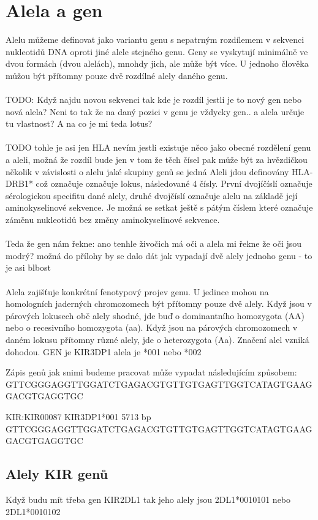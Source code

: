 \documentclass[czech,DP]{thesiskiv}
\begin{document}
\section{Alela a gen}
Alelu můžeme definovat jako variantu genu s nepatrným rozdílemem v sekvenci nukleotidů DNA oproti jiné alele stejného genu. Geny se vyskytují minimálně ve dvou formách (dvou alelách), mnohdy jich, ale může být více. U jednoho člověka můžou být přítomny pouze dvě rozdílné alely daného genu. 
\\
\\
TODO: Když najdu novou sekvenci tak kde je rozdíl jestli je to nový gen nebo nová alela? Neni to tak že na daný pozici v genu je vždycky gen.. a alela určuje tu vlastnost? A na co je mi teda lotus? 
\\
\\
TODO tohle je asi jen HLA nevím jestli existuje něco jako obecné rozdělení genu a aleli, možná že rozdíl bude jen v tom že těch čísel pak může být za hvězdičkou několik v závislosti o alelu jaké skupiny genů se jedná
Aleli jdou definovány HLA-DRB1* což označuje označuje lokus, následované 4 čísly. První dvojíčíslí označuje sérologickou specifitu dané alely, druhé dvojčíslí označuje alelu na základě její aminokyselinové sekvence. Je možná se setkat ještě s pátým číslem které označuje záměnu nukleotidů bez změny aminokyselinové sekvence.
\\
\\
Teda že gen nám řekne: ano tenhle živočich má oči a alela mi řekne že oči jsou modrý?
možná do přílohy by se dalo dát jak vypadají dvě alely jednoho genu - to je asi blbost
\\
\\
Alela zajišťuje konkrétní fenotypový projev genu. U jedince mohou na homologních jaderných chromozomech být přítomny pouze dvě alely. Když jsou v párových lokusech obě alely shodné, jde buď o dominantního homozygota (AA) nebo o recesivního homozygota (aa). Když jsou na párových chromozomech v daném lokusu přítomny různé alely, jde o heterozygota (Aa). Značení alel vzniká dohodou.
GEN je KIR3DP1 alela je *001 nebo *002

Zápis genů jak snimi budeme pracovat může vypadat následujícím způsobem:
GTTCGGGAGGTTGGATCTGAGACGTGTTGTGAGTTGGTCATAGTGAAGGACGTGAGGTGC 

KIR:KIR00087 KIR3DP1*001 5713 bp
GTTCGGGAGGTTGGATCTGAGACGTGTTGTGAGTTGGTCATAGTGAAGGACGTGAGGTGC

\subsection{Alely KIR genů}
Když budu mít třeba gen KIR2DL1
tak jeho alely jsou 2DL1*0010101 nebo 2DL1*0010102
\end{document}
